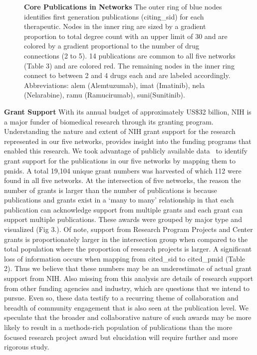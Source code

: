 \documentclass[10pt,letterpaper]{article}
\begin{document}
\begin{figure}[!h]
\begin{adjustwidth}{-0.5in}{0in} %
\centering
\caption{{\bf Core Publications in Networks}  The outer ring of blue nodes identifies first generation publications (citing\_sid) for each therapeutic. Nodes in the inner ring are sized by a gradient proportion to total degree count with an upper limit of 30 and are colored by a gradient proportional to the number of drug connections (2 to 5). 14  publications are common to all five networks (Table 3) and are colored red. The remaining nodes in the inner ring connect to between 2 and 4 drugs each and are labeled accordingly. Abbreviations: alem (Alemtuzumab), imat (Imatinib), nela (Nelarabine), ramu (Ramucirumab), suni(Sunitinib).}
\label{fig2}
\end{adjustwidth}
\end{figure}

\textbf{Grant Support} With its annual budget of approximately US\$32 billion, NIH is a major funder of biomedical research through its granting program. Understanding the nature and extent of NIH grant support for the research represented in our five networks, provides insight into the funding programs that enabled this research. We took advantage of publicly available data~\cite{bibNIHExPORTER} to identify grant support for the publications in our five networks by mapping them to pmids. A total 19,104 unique grant numbers was harvested of which 112 were found in all five networks. At the intersection of five networks, the reason the number of grants is larger than the number of publications is because publications and grants exist in a `many to many' relationship in that each publication can acknowledge support from multiple grants and each grant can support multiple publications. These awards were grouped by major type  and visualized (Fig 3.). Of note, support from Research Program Projects and Center grants is proportionately larger in the intersection group when compared to the total population where the proportion of research projects is larger. A significant loss of information occurs when mapping from cited\_sid to cited\_pmid (Table 2). Thus we believe that these numbers may be an underestimate of actual grant support from NIH. Also missing from this analysis are details of research support from other funding agencies and industry, which are questions that we intend to pursue. Even so, these data testify to a recurring theme of collaboration and breadth of community engagement that is also seen at the publication level. We speculate that the broader and collaborative nature of such awards may be more likely to result in a methods-rich population of publications than the more focused research project award but elucidation will require further and more rigorous study. 
\end{document}
